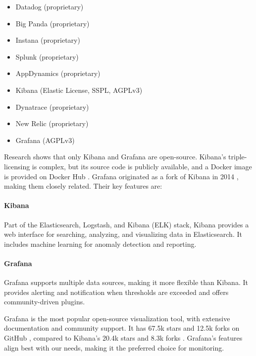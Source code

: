 \begin{multicols}{2} 
    \begin{itemize} 
        \item Datadog (proprietary) 
        \item Big Panda (proprietary) 
        \item Instana (proprietary) 
        \item Splunk (proprietary) 
        \item AppDynamics (proprietary) 
        \item Kibana (Elastic License, SSPL, AGPLv3) 
        \item Dynatrace (proprietary) 
        \item New Relic (proprietary) 
        \item Grafana (AGPLv3) 
    \end{itemize} 
\end{multicols}

Research shows that only Kibana and Grafana are open-source. Kibana's triple-licensing is complex, but its source code is publicly available, and a Docker image is provided on Docker Hub \Parencite{kibana-docker2025}. Grafana originated as a fork of Kibana in 2014 \Parencite{odegaard2019grafana}, making them closely related. Their key features are:

\paragraph{Kibana} Part of the Elasticsearch, Logstash, and Kibana (ELK) stack, Kibana provides a web interface for searching, analyzing, and visualizing data in Elasticsearch. It includes machine learning for anomaly detection and reporting.

\paragraph{Grafana} Grafana supports multiple data sources, making it more flexible than Kibana. It provides alerting and notification when thresholds are exceeded and offers community-driven plugins.

Grafana is the most popular open-source visualization tool, with extensive documentation and community support. It has 67.5k stars and 12.5k forks on GitHub \Parencite{grafana2025}, compared to Kibana's 20.4k stars and 8.3k forks \Parencite{kibana2025}. Grafana's features align best with our needs, making it the preferred choice for monitoring.

